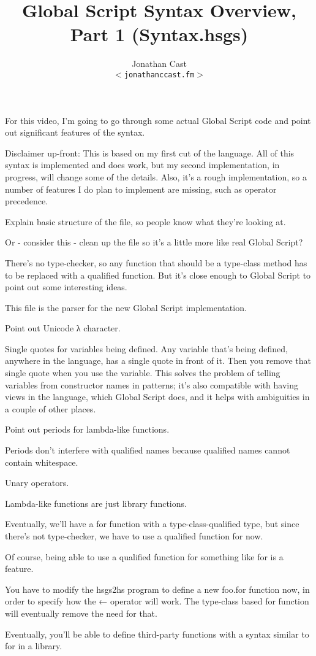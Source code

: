 \documentclass{article}
\title{Global Script Syntax Overview, Part 1 (Syntax.hsgs)}
\author{Jonathan Cast\\$<$\texttt{jonathanccast\@fastmail.fm}$>$}
\begin{document}
For this video, I'm going to go through some actual Global Script code and point out significant features of the syntax.

Disclaimer up-front:
This is based on my first cut of the language.
All of this syntax is implemented and does work,
but my second implementation, in progress, will change some of the details.
Also, it's a rough implementation, so a number of features I do plan to implement are missing,
such as operator precedence.

Explain basic structure of the file, so people know what they're looking at.

Or - consider this - clean up the file so it's a little more like real Global Script?

There's no type-checker,
so any function that should be a type-class method has to be replaced with a qualified function.
But it's close enough to Global Script to point out some interesting ideas.

This file is the parser for the new Global Script implementation.

Point out Unicode λ character.

Single quotes for variables being defined.
Any variable that's being defined, anywhere in the language, has a single quote in front of it.
Then you remove that single quote when you use the variable.
This solves the problem of telling variables from constructor names in patterns;
it's also compatible with having views in the language, which Global Script does,
and it helps with ambiguities in a couple of other places.

Point out periods for lambda-like functions.

Periods don't interfere with qualified names because qualified names cannot contain whitespace.

Unary operators.

Lambda-like functions are just library functions.

Eventually, we'll have a for function with a type-class-qualified type,
but since there's not type-checker, we have to use a qualified function for now.

Of course, being able to use a qualified function for something like for is a feature.

You have to modify the hsgs2hs program to define a new foo.for function now,
in order to specify how the ← operator will work.
The type-class based for function will eventually remove the need for that.

Eventually, you'll be able to define third-party functions with a syntax similar to for in a library.
\end{document}

